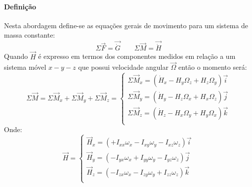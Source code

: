 \documentclass{article}
\begin{document}
            \paragraph{Definição}Nesta abordagem define-se as equações gerais de movimento para um sistema de massa constante:
                \begin{equation}
                    \boxed{
                        \Sigma\vec{F} = \vec{\dot{G}}
                    }
                    \qquad
                    \boxed{
                        \Sigma\vec{M} = \vec{\dot{H}}
                    }
                \end{equation}
            Quando $\vec{H}$ é expresso em termos dos componentes medidos em relação a um sistema móvel $x-y-z$ que possui velocidade angular $\vec{\Omega}$ então o momento será:
                \begin{equation}
                    \boxed{
                        \Sigma\vec{M} = 
                        \Sigma\vec{M}_{x} + 
                        \Sigma\vec{M}_{y} + 
                        \Sigma\vec{M}_{z} = 
                        \begin{cases}
                            \Sigma\vec{M}_{x} = (\dot{H}_{x} - H_{y}\Omega_{z} + H_{z}\Omega_{y})\vec{i}\\
                            \Sigma\vec{M}_{y} = (\dot{H}_{y} - H_{z}\Omega_{x} + H_{x}\Omega_{z})\vec{j}\\
                            \Sigma\vec{M}_{z} = (\dot{H}_{z} - H_{x}\Omega_{y} + H_{y}\Omega_{x})\vec{k}\\
                        \end{cases}
                    }
                \end{equation}
            Onde:
                \begin{equation}
                    \boxed{
                        \vec{H} = 
                        \begin{cases}
                            \vec{H}_{x} = (+I_{xx}\omega_{x} - I_{xy}\omega_{y} - I_{xz}\omega_{z})\vec{i}\\
                            \vec{H}_{y} = (-I_{yx}\omega_{x} + I_{yy}\omega_{y} - I_{yz}\omega_{z})\vec{j}\\
                            \vec{H}_{z} = (-I_{zx}\omega_{x} - I_{zy}\omega_{y} + I_{zz}\omega_{z})\vec{k}\\
                        \end{cases}
                    }
                \end{equation}
\end{document}
